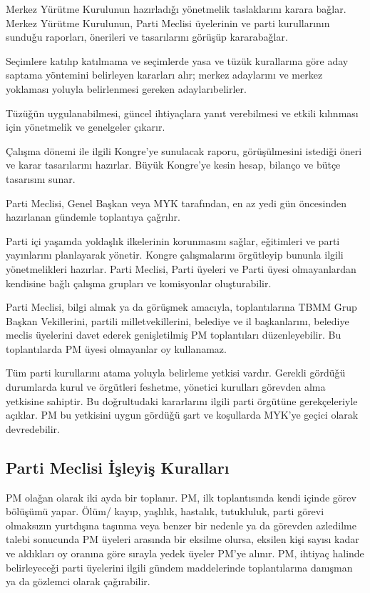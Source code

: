 \documentclass[11pt]{article} %
\begin{document}
Merkez Yürütme Kurulunun hazırladıǧı yönetmelik taslaklarını karara baǧlar. Merkez Yürütme Kurulunun, Parti Meclisi üyelerinin ve parti kurullarının sunduǧu raporları, önerileri ve tasarılarını görüşüp kararabaǧlar.

Seçimlere katılıp katılmama ve seçimlerde yasa ve tüzük kurallarına göre aday saptama yöntemini belirleyen kararları alır; merkez adaylarını ve merkez yoklaması yoluyla belirlenmesi gereken adaylarıbelirler.

Tüzüǧün uygulanabilmesi, güncel ihtiyaçlara yanıt verebilmesi ve etkili kılınması için yönetmelik ve genelgeler çıkarır.

Çalışma dönemi ile ilgili Kongre’ye sunulacak raporu, görüşülmesini istediǧi öneri ve karar tasarılarını hazırlar.
Büyük Kongre’ye kesin hesap, bilanço ve bütçe tasarısını sunar.

Parti Meclisi, Genel Başkan veya MYK tarafından, en az yedi gün öncesinden hazırlanan gündemle toplantıya çaǧrılır.

Parti içi yaşamda yoldaşlık ilkelerinin korunmasını saǧlar, eǧitimleri ve parti yayınlarını planlayarak yönetir. Kongre çalışmalarını örgütleyip bununla ilgili yönetmelikleri hazırlar. Parti Meclisi, Parti üyeleri ve Parti üyesi olmayanlardan kendisine baǧlı çalışma grupları ve komisyonlar oluşturabilir.

Parti Meclisi, bilgi almak ya da görüşmek amacıyla, toplantılarına TBMM Grup Başkan Vekillerini, partili milletvekillerini, belediye ve il başkanlarını, belediye meclis üyelerini davet ederek genişletilmiş PM toplantıları düzenleyebilir. Bu toplantılarda PM üyesi olmayanlar oy kullanamaz.

Tüm parti kurullarını atama yoluyla belirleme yetkisi vardır. Gerekli gördüǧü durumlarda kurul ve örgütleri feshetme, yönetici kurulları görevden alma yetkisine sahiptir. Bu doǧrultudaki kararlarını ilgili parti örgütüne gerekçeleriyle açıklar. PM bu yetkisini uygun gördüǧü şart ve koşullarda MYK’ye geçici olarak devredebilir.
\subsection{Parti Meclisi İşleyiş Kuralları}  
PM olaǧan olarak iki ayda bir toplanır. PM, ilk toplantısında kendi içinde görev bölüşümü yapar. Ölüm/ kayıp, yaşlılık, hastalık, tutukluluk, parti görevi olmaksızın yurtdışına taşınma veya benzer bir nedenle ya da görevden azledilme talebi sonucunda PM üyeleri arasında bir eksilme olursa, eksilen kişi sayısı kadar ve aldıkları oy oranına göre sırayla yedek üyeler PM’ye alınır. PM, ihtiyaç halinde belirleyeceǧi parti üyelerini ilgili gündem maddelerinde toplantılarına danışman ya da gözlemci olarak çaǧırabilir.
\end{document}

